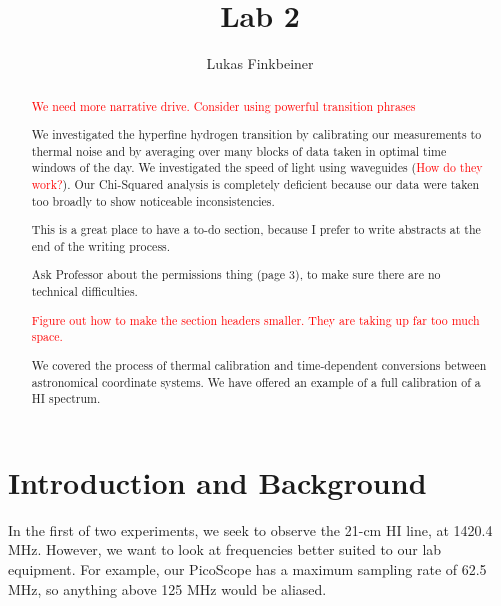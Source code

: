 \documentclass[12pt]{article}
\title{Lab 2}
\author{Lukas Finkbeiner}
\begin{document}
\maketitle

\begin{abstract}

\textcolor{red}{We need more narrative drive. Consider using powerful transition phrases}

We investigated the hyperfine hydrogen transition by calibrating our measurements to thermal noise and by averaging over many blocks of data taken in optimal time windows of the day. We investigated the speed of light using waveguides (\textcolor{red}{How do they work?}). Our Chi-Squared analysis is completely deficient because our data were taken too broadly to show noticeable inconsistencies.

This is a great place to have a to-do section, because I prefer to write abstracts at the end of the writing process.

\quad * Ask Professor about the permissions thing (page 3), to make sure there are no technical difficulties.

\textcolor{red}{Figure out how to make the section headers smaller. They are taking up far too much space.}

We covered the process of thermal calibration and time-dependent conversions between astronomical coordinate systems. We have offered an example of a full calibration of a HI spectrum.

\end{abstract}

\section{Introduction and Background}

\quad \quad In the first of two experiments, we seek to observe the 21-cm HI line, at 1420.4 MHz. However, we want to look at frequencies better suited to our lab equipment. For example, our PicoScope has a maximum sampling rate of 62.5 MHz, so anything above 125 MHz would be aliased.
\end{document}
